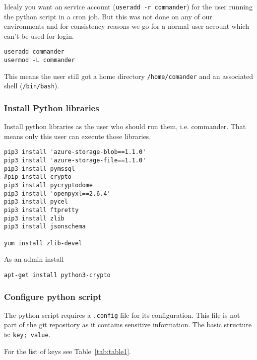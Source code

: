 Idealy you want an service account (\verb|useradd -r commander|) for the user running the python script in a cron job. But this was not done on any of our environments and
for consistency reasons we go for a normal user account which can't be used for login.
\begin{verbatim}
useradd commander
usermod -L commander
\end{verbatim}
This means the user still got a home directory \verb|/home/comander| and an associated shell (\verb|/bin/bash|).

\subsubsection{Install Python libraries}

Install python libraries as the user who should run them, i.e. commander. That means only this user can execute those libraries.
\begin{verbatim}
pip3 install 'azure-storage-blob==1.1.0'
pip3 install 'azure-storage-file==1.1.0'
pip3 install pymssql
#pip install crypto
pip3 install pycryptodome
pip3 install 'openpyxl==2.6.4'
pip3 install pycel
pip3 install ftpretty
pip3 install zlib
pip3 install jsonschema

yum install zlib-devel
\end{verbatim}

As an admin install

\verb|apt-get install python3-crypto|

\subsubsection{Configure python script}

The python script requires a \verb|.config| file for its configuration. This file is not part of the git repository as it contains sensitive information.
The basic structure is:
\verb|key; value|.

For the list of keys see Table~\ref{tab:table1}.

